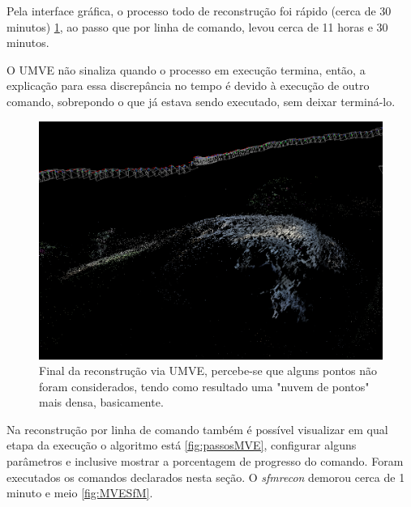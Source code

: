 Pela interface gráfica, o processo todo de reconstrução foi rápido (cerca de 30 minutos) \ref{fig:UMVEdense}, ao passo que por linha de comando, levou cerca de 11 horas e 30 minutos. 

O UMVE não sinaliza quando o processo em execução termina, então, a explicação para essa discrepância no tempo é devido à execução de outro comando, sobrepondo o que já estava sendo executado, sem deixar terminá-lo.

\begin{figure}[!h]
	\centering
	\includegraphics[width=0.5\linewidth]{figs/umvedense.png}
	\caption{%
	Final da reconstrução via UMVE, percebe-se que alguns pontos não foram considerados, tendo como resultado uma "nuvem de pontos" mais densa, basicamente.
	}\label{fig:UMVEdense}
\end{figure} 

Na reconstrução por linha de comando também é possível visualizar em qual etapa da execução o algoritmo está \ref{fig:passosMVE}, configurar alguns parâmetros e inclusive mostrar a porcentagem de progresso do comando. Foram executados os comandos declarados nesta seção.  O \emph{sfmrecon} demorou cerca de 1 minuto e meio \ref{fig:MVESfM}.

